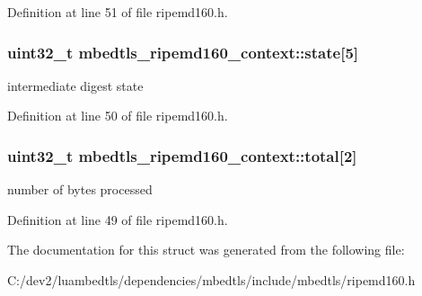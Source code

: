 Definition at line 51 of file ripemd160.\-h.

\hypertarget{structmbedtls__ripemd160__context_af56cf97ec4c54ae4bb540422b459782c}{
\subsubsection[{state}]{\setlength{\rightskip}{0pt plus 5cm}uint32\-\_\-t mbedtls\-\_\-ripemd160\-\_\-context\-::state\mbox{[}5\mbox{]}}}\label{structmbedtls__ripemd160__context_af56cf97ec4c54ae4bb540422b459782c}
intermediate digest state 

Definition at line 50 of file ripemd160.\-h.

\hypertarget{structmbedtls__ripemd160__context_afc1ec88d27b692be26d819a752be8d4a}{
\subsubsection[{total}]{\setlength{\rightskip}{0pt plus 5cm}uint32\-\_\-t mbedtls\-\_\-ripemd160\-\_\-context\-::total\mbox{[}2\mbox{]}}}\label{structmbedtls__ripemd160__context_afc1ec88d27b692be26d819a752be8d4a}
number of bytes processed 

Definition at line 49 of file ripemd160.\-h.



The documentation for this struct was generated from the following file\-:\begin{DoxyCompactItemize}
\item 
C\-:/dev2/luambedtls/dependencies/mbedtls/include/mbedtls/ripemd160.\-h\end{DoxyCompactItemize}
